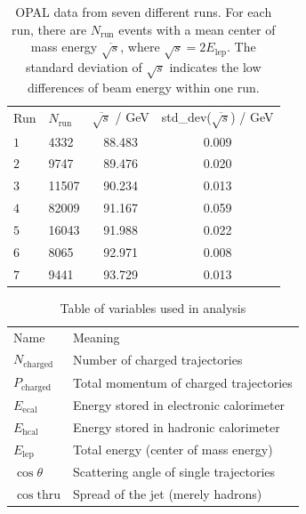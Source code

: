 \begin{table}[htpb]
    \centering
    \caption{OPAL data from seven different runs. For each run, there are $N_\mathrm{run}$ events with a mean center of mass 
        energy $\overline{\sqrt{s}}$, where $\sqrt{s} = 2 E_\mathrm{lep}$. The standard deviation of 
    $\sqrt{s}$ indicates the low differences of beam energy within one run. }
    \label{tab:event_data}
    \begin{tabular}{l l c c}
        \rowcolor{LightCyan}Run & $N_\mathrm{run}$ & $\overline{\sqrt{s}}$ / GeV & std\_dev($\overline{\sqrt{s}}$) / GeV \\
        \cellcolor{LightCyan}$1$& 4332 & 88.483 & 0.009   \\
        \cellcolor{LightCyan}$2$& 9747 & 89.476 & 0.020   \\
        \cellcolor{LightCyan}$3$& 11507 & 90.234 & 0.013   \\
        \cellcolor{LightCyan}$4$& 82009 & 91.167 & 0.059   \\
        \cellcolor{LightCyan}$5$& 16043 & 91.988 & 0.022   \\
        \cellcolor{LightCyan}$6$& 8065 & 92.971 & 0.008   \\
        \cellcolor{LightCyan}$7$& 9441 & 93.729 & 0.013   \\
    \end{tabular}
\end{table}

\begin{table}[htpb]
    \centering
    \caption{Table of variables used in analysis}
    \label{tab:vars}
    \begin{tabular}{l|l}
  \rowcolor{LightCyan} Name & Meaning \\ 
    $N_{\mathrm{charged} }$ & Number of charged trajectories \\
    $P_{\mathrm{charged} }$ & Total momentum of charged trajectories \\
    $E_{\mathrm{ecal}}$ & Energy stored in electronic calorimeter \\
    $E_{\mathrm{hcal}}$ & Energy stored in hadronic calorimeter \\
    $E_{\mathrm{lep}}$ & Total energy (center of mass energy) \\
    $\cos\theta$ & Scattering angle of single trajectories \\
    $\cos\mathrm{thru} $ & Spread of the jet (merely hadrons)\\
    \end{tabular}
\end{table}






